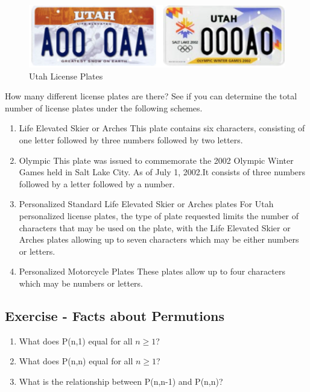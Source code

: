 \documentclass[]{book}
\providecommand{\tightlist}{%
  \setlength{\itemsep}{0pt}\setlength{\parskip}{0pt}}
\theoremstyle{definition}
\theoremstyle{definition}
\theoremstyle{definition}
\theoremstyle{remark}
\begin{document}
\begin{figure}

{\centering \includegraphics[width=0.3\linewidth]{01-basics-figures/utah_license_plates} 

}

\caption{Utah License Plates}\label{fig:nice-fig-91}
\end{figure}

How many different license plates are there? See if you can determine
the total number of license plates under the following schemes.

\begin{enumerate}
\def\labelenumi{(\alph{enumi})}
\item
  Life Elevated Skier or Arches This plate contains six characters,
  consisting of one letter followed by three numbers followed by two
  letters.
\item
  Olympic This plate was issued to commemorate the 2002 Olympic Winter
  Games held in Salt Lake City. As of July 1, 2002.It consists of three
  numbers followed by a letter followed by a number.
\item
  Personalized Standard Life Elevated Skier or Arches plates For Utah
  personalized license plates, the type of plate requested limits the
  number of characters that may be used on the plate, with the Life
  Elevated Skier or Arches plates allowing up to seven characters which
  may be either numbers or letters.
\item
  Personalized Motorcycle Plates These plates allow up to four
  characters which may be numbers or letters.
\end{enumerate}

\subsection{Exercise - Facts about
Permutions}\label{exercise---facts-about-permutions}

\begin{enumerate}
\def\labelenumi{(\alph{enumi})}
\tightlist
\item
  What does P(n,1) equal for all \(n \geq 1\)?
\item
  What does P(n,n) equal for all \(n \geq 1\)?
\item
  What is the relationship between P(n,n-1) and P(n,n)?
\end{enumerate}
\end{document}
